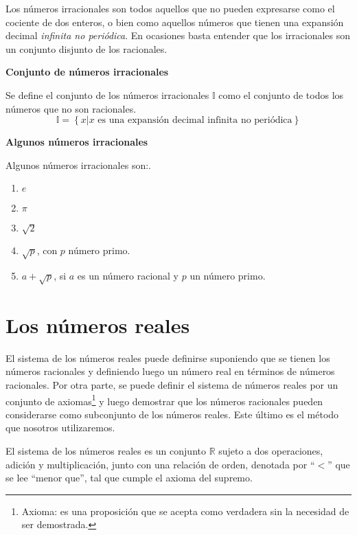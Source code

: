 Los números irracionales son todos aquellos que no pueden expresarse como el cociente de dos enteros, o bien como aquellos números que tienen una expansión decimal \textit{infinita no periódica}. En ocasiones basta entender que los irracionales son un conjunto disjunto de los racionales.

\vspace{0.21cm}
\begin{tcolorbox}
	\begin{defi}\textbf{Conjunto de números irracionales}\end{defi}
	Se define el conjunto de los números irracionales $\mathbb{I}$ como el conjunto de todos los números que no son racionales.
		  \[ \mathbb{I} = \left\{ x | x \mbox{ es una expansión decimal infinita no periódica} \right\} \]
\end{tcolorbox}

\begin{examp}{\textbf{Algunos números irracionales}}

	\noindent Algunos números irracionales son:.
	
	\begin{enumerate}
		\item $e$
		\item $\pi$
		\item $\sqrt{2}$
		\item $\sqrt{p}$, con $p$ número primo.
		\item $a + \sqrt{p}$, si $a$ es un número racional y $p$ un número primo.
	\end{enumerate}
\end{examp}

	\section{Los números reales}
	
	El sistema de los números reales puede definirse suponiendo que se tienen los números racionales y definiendo luego un número real en términos de números racionales. Por otra parte, se puede definir el sistema de números reales por un conjunto de axiomas\footnote{Axioma: es una proposición que se acepta como verdadera sin la necesidad de ser demostrada.} y luego demostrar que los números racionales pueden considerarse como subconjunto de los números reales. Este último es el método que nosotros utilizaremos.
	
	El sistema de los números reales es un conjunto $\mathbb{R}$ sujeto a dos operaciones, adición y multiplicación, junto con una relación de orden, denotada por “$<$” que se lee “menor que”, tal que cumple el axioma del supremo.
	
